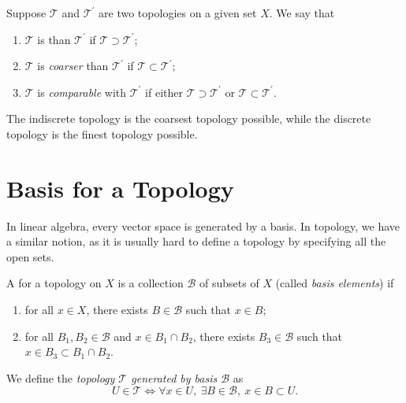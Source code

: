 \begin{definition}
Suppose $\mathcal{T}$ and $\mathcal{T}^\prime$ are two topologies on a given set $X$. We say that
\begin{enumerate}[label=(\roman*)]
\item $\mathcal{T}$ is  than $\mathcal{T}^\prime$ if $\mathcal{T}\supset\mathcal{T}^\prime$;
\item $\mathcal{T}$ is \emph{coarser} than $\mathcal{T}^\prime$ if $\mathcal{T}\subset\mathcal{T}^\prime$;
\item $\mathcal{T}$ is \emph{comparable} with $\mathcal{T}^\prime$ if either $\mathcal{T}\supset\mathcal{T}^\prime$ or $\mathcal{T}\subset\mathcal{T}^\prime$.
\end{enumerate}
\end{definition}

\begin{remark}
The indiscrete topology is the coarsest topology possible, while the discrete topology is the finest topology possible.
\end{remark}

\section{Basis for a Topology}
In linear algebra, every vector space is generated by a basis. In topology, we have a similar notion, as it is usually hard to define a topology by specifying all the open sets.

\begin{definition}[Basis]\label{defn:topology-basis}
A  for a topology on $X$ is a collection $\mathcal{B}$ of subsets of $X$ (called \emph{basis elements}) if
\begin{enumerate}[label=(\roman*)]
\item for all $x\in X$, there exists $B\in\mathcal{B}$ such that $x\in B$;
\item for all $B_1,B_2\in\mathcal{B}$ and $x\in B_1\cap B_2$, there exists $B_3\in\mathcal{B}$ such that $x\in B_3\subset B_1\cap B_2$.
\end{enumerate}
We define the \emph{topology $\mathcal{T}$ generated by basis $\mathcal{B}$} as
\begin{equation}
U\in\mathcal{T}\iff\forall x\in U,\:\exists B\in\mathcal{B},\:x\in B\subset U.
\end{equation}
\end{definition}

